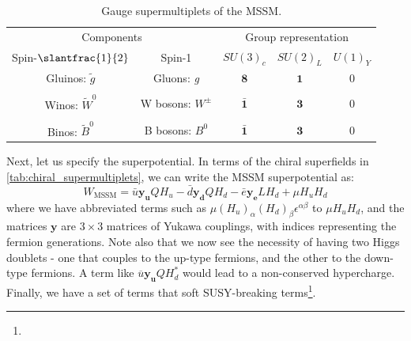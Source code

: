 \begin{table}
  \caption{Gauge supermultiplets of the MSSM.}
  \label{tab:gauge_supermultiplets}
  \begin{tabular}{ccccc}
    \toprule
\multicolumn{2}{c}{Components} & \multicolumn{3}{c}{Group representation} \\ \cmidrule(r){1-2}\cmidrule(l){3-5}
Spin-$\slantfrac{1}{2}$        & Spin-1                                                                         & $SU(3)_c$          & $SU(2)_L$    & $U(1)_Y$\\\midrule
Gluinos: $\widetilde{g}$       & Gluons: \emph{g}                                                               & $\mathbf{8}$       & $\mathbf{1}$ & 0 \\\\
Winos: $\widetilde{W}^0$       & W bosons: $W^\pm$                                                              & $\bar{\mathbf{1}}$ & $\mathbf{3}$ & 0\\\\
Binos: $\widetilde{B}^0$       & B bosons: $B^0$                                                                & $\bar{\mathbf{1}}$ & $\mathbf{3}$ & 0\\
    \bottomrule
  \end{tabular}
\end{table}
Next, let us specify the superpotential. In terms of the chiral superfields in \autoref{tab:chiral_supermultiplets}, we can write the MSSM superpotential as:
\[W_\text{MSSM} = \bar{u}\mathbf{y_u}QH_u-\bar{d}\mathbf{y_d}Q H_d-\bar{e}\mathbf{y_e}L H_d+\mu H_u H_d \]
where we have abbreviated terms such as $\mu(H_u)_\alpha (H_d)_\beta\epsilon^{\alpha\beta}$ to $\mu H_u H_d$, and the matrices $\mathbf{y}$ are $3\times3$ matrices of Yukawa couplings, with indices representing the fermion generations. 
Note also that we now see the necessity of having two Higgs doublets - one that couples to the up-type fermions, and the other to the down-type fermions. A term like $\overline{u}\mathbf{y_u}QH_d^*$ would lead to a non-conserved hypercharge.
Finally, we have a set of terms that soft SUSY-breaking terms\footnote{}.
